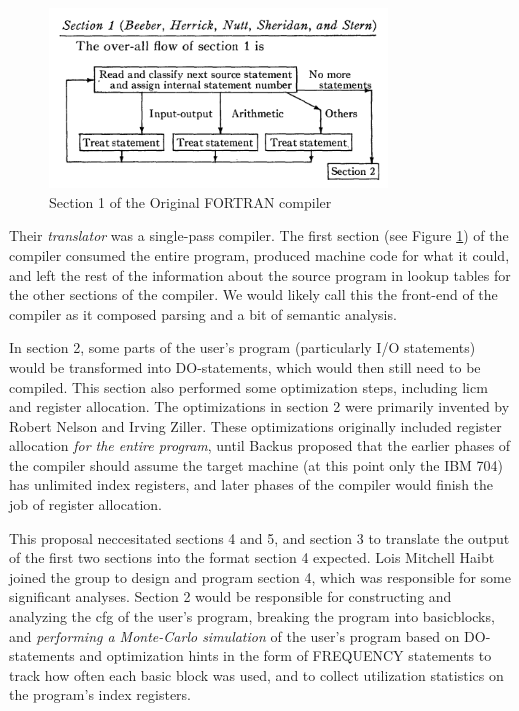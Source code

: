 \begin{figure}[h]
	\centering
	\includegraphics[width=0.8\textwidth]{resource/dawn/backus-fortran-sec-1.png}
	\caption{Section 1 of the Original FORTRAN compiler\cite{backus_etal_fortran_automatic_coding_system_1957}}
	\label{fig:backus_fortran_compiler}
\end{figure}

Their \textit{translator} was a single-pass compiler.
The first section (see Figure \ref{fig:backus_fortran_compiler}) of the compiler
consumed the entire program, produced machine code for what it could,
and left the rest of the information about the source program in lookup tables
for the other sections of the compiler.
We would likely call this the front-end of the compiler as it composed
parsing and a bit of semantic analysis.

In section 2, some parts of the user's program (particularly I/O statements)
would be transformed into DO-statements, which would then still need to be compiled.
This section also performed some optimization steps, including \gls{licm} and
register allocation.
The optimizations in section 2 were primarily invented by Robert Nelson and Irving Ziller.
These optimizations originally included register allocation \textit{for the entire program},
until Backus proposed that the earlier phases of the compiler should assume the
target machine (at this point only the IBM 704) has unlimited index registers,
and later phases of the compiler would finish the job of register allocation.

This proposal neccesitated sections 4 and 5, and section 3 to translate the
output of the first two sections into the format section 4 expected.
Lois Mitchell Haibt joined the group to design and program section 4,
which was responsible for some significant analyses.
Section 2 would be responsible for constructing and analyzing the \gls{cfg}
of the user's program, breaking the program into \gls{basicblock}s,
and \textit{performing a Monte-Carlo simulation} of the user's program
based on DO-statements and optimization hints in the form of FREQUENCY statements
to track how often each basic block was used, and to collect utilization
statistics on the program's index registers.

